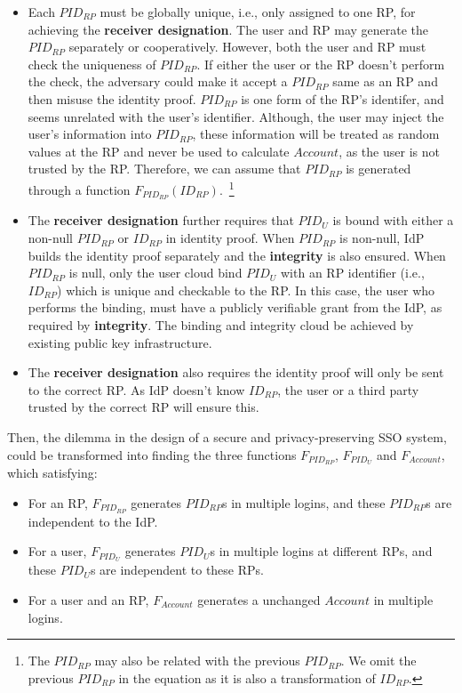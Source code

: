 \begin{itemize}
  \item %
  Each $PID_{RP}$ must be globally unique, i.e., only assigned to one RP,  for achieving the \textbf{receiver designation}.
        The user and RP may generate the $PID_{RP}$ separately or cooperatively.
        However, both the user and RP must check the uniqueness of $PID_{RP}$.
        If either the user or the RP doesn't perform the check, the adversary could make it accept a $PID_{RP}$ same as an RP and then misuse the identity proof.
        $PID_{RP}$ is one form of the RP's identifer, and seems unrelated with the user's identifier.
        Although, the user may inject the user's information into $PID_{RP}$, these information will be treated as random values at the RP and never be used to calculate $Account$, as the user is not trusted by the RP.
        Therefore, we can assume that $PID_{RP}$ is generated through a function $F_{PID_{RP}}(ID_{RP})$.~\footnote{The $PID_{RP}$ may also be related with the previous $PID_{RP}$. We omit the previous $PID_{RP}$ in the equation as it is also a transformation of $ID_{RP}$.}
  \item The \textbf{receiver designation} further requires that  $PID_{U}$ is bound with either a non-null $PID_{RP}$ or $ID_{RP}$ in identity proof.
        When $PID_{RP}$  is non-null, IdP builds the identity proof separately and the \textbf{integrity} is also ensured.
        When $PID_{RP}$  is null, only the user cloud bind $PID_{U}$ with an RP identifier (i.e., $ID_{RP}$) which is unique and checkable to the RP.
        In this case, the user who performs the binding, must have a publicly verifiable grant from the IdP, as required by \textbf{integrity}.
        The binding and integrity cloud be achieved by existing public key infrastructure.
   \item The \textbf{receiver designation} also requires the identity proof will only be sent to the correct RP.
       As IdP doesn't know $ID_{RP}$, the user or a third party trusted by the correct RP will ensure this.
\end{itemize}

Then, the dilemma in the design of a secure and privacy-preserving SSO system, could be transformed into finding the three functions  $F_{PID_{RP}}$,  $F_{PID_{U}}$ and $F_{Account}$, which satisfying:
\begin{itemize}
  \item For an RP, $F_{PID_{RP}}$ generates $PID_{RP}$s in multiple logins, and these  $PID_{RP}$s are independent to the IdP.
  \item For a user, $F_{PID_{U}}$ generates $PID_{U}$s in multiple logins at different RPs, and these $PID_{U}$s are independent to these RPs.
  \item For a user and an RP, $F_{Account}$ generates a unchanged $Account$ in multiple logins.
\end{itemize}

